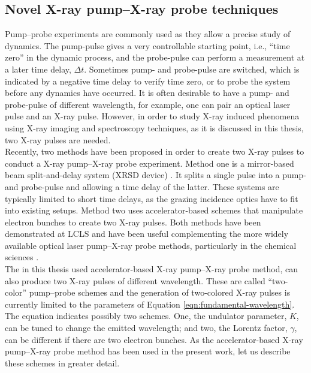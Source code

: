 \subsection{Novel X-ray pump–X-ray probe techniques}\label{sec:novel-pump--probe-tech}
Pump--probe experiments are commonly used as they allow a precise study of dynamics. The pump-pulse gives a very controllable starting point, i.e., ``time zero'' in the dynamic process, and the probe-pulse can perform a measurement at a later time delay, $\Delta t$. Sometimes pump- and probe-pulse are switched, which is indicated by a negative time delay to verify time zero, or to probe the system before any dynamics have occurred.
It is often desirable to have a pump- and probe-pulse of different wavelength, for example, one can pair an optical laser pulse and an X-ray pulse.
However, in order to study X-ray induced phenomena using X-ray imaging and spectroscopy techniques, as it is discussed in this thesis, two X-ray pulses are needed.\\[1\baselineskip]
%
Recently, two methods have been proposed in order to create two X-ray pulses to conduct a X-ray pump--X-ray probe experiment. Method one is a mirror-based beam split-and-delay system (XRSD device) \citep{Castagna-2013-JPCS,Murphy-2012-SPIE,Berrah-2016-OE}. It splits a single pulse into a pump- and probe-pulse and allowing a time delay of the latter. These systems are typically limited to short time delays, as the grazing incidence optics have to fit into existing setups. Method two uses accelerator-based schemes \citep{Lutman-2013-PRL,Marinelli-2015-NatComm} that manipulate electron bunches to create two X-ray pulses.
Both methods have been demonstrated at LCLS and have been useful complementing the more widely available optical laser pump--X-ray probe methods, particularly in the chemical sciences \citep{Picon-2016-NatComm,Ferguson-2016-SciAdv,Liekhus-Schmaltz-2015-NatComm}.\\[1\baselineskip]
%
The in this thesis used accelerator-based X-ray pump--X-ray probe method, can also produce two X-ray pulses of different wavelength. These are called ``two-color'' pump--probe schemes and the generation of two-colored X-ray pulses is currently limited to the parameters of Equation \eqref{eqn:fundamental-wavelength}. The equation indicates possibly two schemes. One, the undulator parameter, $K$, can be tuned to change the emitted wavelength; and two, the Lorentz factor, $\gamma$, can be different if there are two electron bunches. As the accelerator-based X-ray pump--X-ray probe method has been used in the present work, let us describe these schemes in greater detail.
%
%
%
